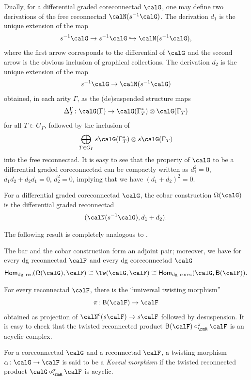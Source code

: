 Dually, for a differential graded coreconnectad $\calG$, one may define two derivations of the free reconnectad $\calN(s^{-1}\calG)$. The derivation $d_1$ is the unique extension of the map
 \[
s^{-1}\calG\to s^{-1}\calG\hookrightarrow\calN(s^{-1}\calG),
 \]
where the first arrow corresponds to the differential of $\calG$ and the second arrow is the obvious inclusion of graphical collections. The derivation $d_2$ is the unique extension of the map
 \[
s^{-1}\calG\to \calN(s^{-1}\calG) 
 \]
obtained, in each arity $\Gamma$, as the (de)suspended structure maps 
 \[
\Delta_T^\Gamma\colon  \calG(\Gamma)\to \calG(\Gamma^*_T)\otimes \calG(\Gamma_T)
 \]
for all $T\in G_\Gamma$, followed by the inclusion of
 \[
\bigoplus_{T\in G_\Gamma}s\calG(\Gamma^*_T)\otimes s\calG(\Gamma_T)
 \]
into the free reconnectad. It is easy to see that the property of $\calG$ to be a differential graded coreconnectad can be compactly written as $d_1^2=0$, $d_1d_2+d_2d_1=0$, $d_2^2=0$, implying that we have $(d_1+d_2)^2=0$.

\begin{defi}
For a differential graded coreconnectad $\calG$, the cobar construction $\Omega(\calG)$ is the differential graded reconnectad 
 \[
(\calN(s^{-1}\calG),d_1+d_2).
 \]
\end{defi}

The following result is completely analogous to \cite[Th.~6.5.10]{MR2954392}.

\begin{prop}
The bar and the cobar construction form an adjoint pair; moreover, we have for every dg reconnectad $\calF$ and every dg coreconnectad $\calG$
 \[
\mathsf{Hom}_{\mathrm{dg\ rec}}(\Omega(\calG), \calF)\cong\Tw(\calG,\calF) \cong \mathsf{Hom}_{\mathrm{dg\ corec}}(\calG, \mathsf{B}(\calF)).
 \]
\end{prop} 

For every reconnectad $\calF$, there is the ``universal twisting morphism'' $$\pi\colon\mathsf{B}(\calF)\to\calF$$ obtained as projection of $\calN^c(s\calF)\to s\calF $ followed by desuspension. It is easy to check that the twisted reconnected product $\mathsf{B}(\calF)\circ^\pi_{\rmR}\calF$ is an acyclic complex.

\begin{defi}
For a coreconnectad $\calG$ and a reconnectad $\calF$, a twisting morphism $\alpha\colon\calG\to\calF$ is said to be a \emph{Koszul morphism} if the twisted reconnected product $\calG\circ^\alpha_{\rmR}\calF$ is acyclic. 
\end{defi}

